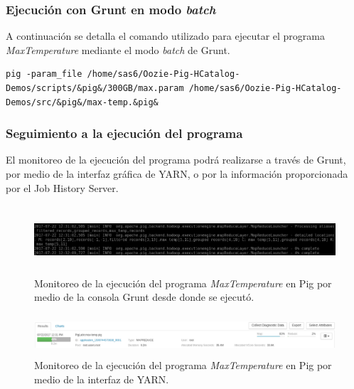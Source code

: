 \subsubsection{Ejecución con Grunt en modo \textit{batch}}

A continuación se detalla el comando utilizado para ejecutar el programa \textit{MaxTemperature} mediante el modo \textit{batch} de Grunt.

\begin{lstlisting}[linewidth=\columnwidth,breaklines=true]
pig -param_file /home/sas6/Oozie-Pig-HCatalog-Demos/scripts/&pig&/300GB/max.param /home/sas6/Oozie-Pig-HCatalog-Demos/src/&pig&/max-temp.&pig&
\end{lstlisting}

\subsubsection{Seguimiento a la ejecución del programa}

El monitoreo de la ejecución del programa podrá realizarse a través de Grunt, por medio de la interfaz gráfica de YARN, o por la información proporcionada por el Job History Server.

\begin{figure}[H]
  \centering
      \includegraphics[width=\textwidth, height=1.0in]{fig/04/03}
  \caption{Monitoreo de la ejecución del programa \textit{MaxTemperature} en Pig por medio de la consola Grunt desde donde se ejecutó.}
\end{figure}

\begin{figure}[H]
  \centering
      \includegraphics[width=\textwidth, height=0.6in]{fig/04/04}
  \caption{Monitoreo de la ejecución del programa \textit{MaxTemperature} en Pig por medio de la interfaz de YARN.}
\end{figure}

